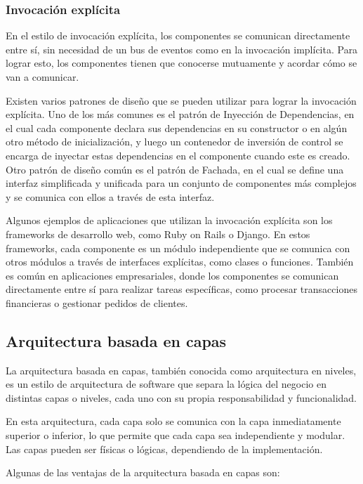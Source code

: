 \documentclass[executivepaper]{article}
\begin{document}
\subsubsection*{Invocación explícita}

En el estilo de invocación explícita, los componentes se comunican directamente entre sí, sin necesidad de un bus de eventos como en la invocación implícita. Para lograr esto, los componentes tienen que conocerse mutuamente y acordar cómo se van a comunicar.

Existen varios patrones de diseño que se pueden utilizar para lograr la invocación explícita. Uno de los más comunes es el patrón de Inyección de Dependencias, en el cual cada componente declara sus dependencias en su constructor o en algún otro método de inicialización, y luego un contenedor de inversión de control se encarga de inyectar estas dependencias en el componente cuando este es creado. Otro patrón de diseño común es el patrón de Fachada, en el cual se define una interfaz simplificada y unificada para un conjunto de componentes más complejos y se comunica con ellos a través de esta interfaz.

Algunos ejemplos de aplicaciones que utilizan la invocación explícita son los frameworks de desarrollo web, como Ruby on Rails o Django. En estos frameworks, cada componente es un módulo independiente que se comunica con otros módulos a través de interfaces explícitas, como clases o funciones. También es común en aplicaciones empresariales, donde los componentes se comunican directamente entre sí para realizar tareas específicas, como procesar transacciones financieras o gestionar pedidos de clientes.

\newpage
\subsection{Arquitectura basada en capas}

La arquitectura basada en capas, también conocida como arquitectura en niveles, es un estilo de arquitectura de software que separa la lógica del negocio en distintas capas o niveles, cada uno con su propia responsabilidad y funcionalidad.

En esta arquitectura, cada capa solo se comunica con la capa inmediatamente superior o inferior, lo que permite que cada capa sea independiente y modular. Las capas pueden ser físicas o lógicas, dependiendo de la implementación.

Algunas de las ventajas de la arquitectura basada en capas son:
\end{document}
